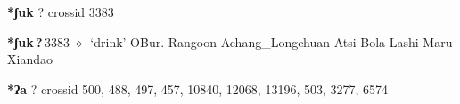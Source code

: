 \item
\textbf{*ʃuk}
?
  {\tiny crossid 3383}
  \begin{list}{}{\leftmargin=1.5em \itemindent=-1.5em}
  \item {\footnotesize \textbf{*ʃuk\,?\,}}{\tiny 3383}
         $\diamond$~`drink'
         OBur. 
\hspace{1ex}
         Rangoon 
\hspace{1ex}
         Achang\_Longchuan 
\hspace{1ex}
         Atsi 
\hspace{1ex}
         Bola 
\hspace{1ex}
         Lashi 
\hspace{1ex}
         Maru 
\hspace{1ex}
         Xiandao 
  \end{list}
\item
\textbf{*ʔa}
?
  {\tiny crossid 500, 488, 497, 457, 10840, 12068, 13196, 503, 3277, 6574}

